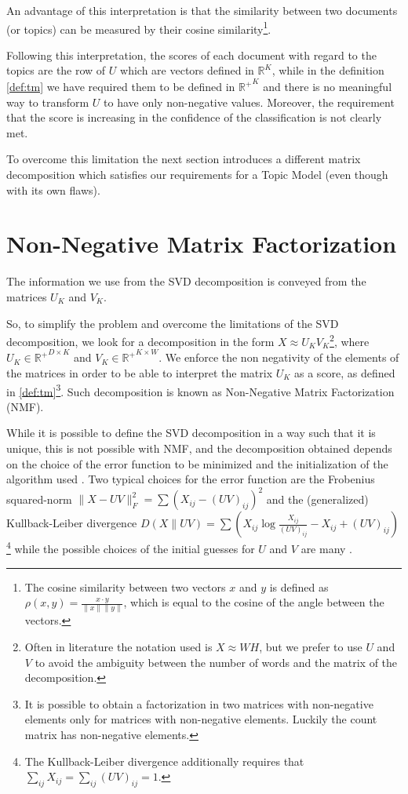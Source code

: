 \documentclass[11pt, a4paper, oneside, openright]{book}
\begin{document}
An advantage of this interpretation is that the similarity between two documents (or topics) can be measured by their cosine similarity\footnote{The cosine similarity between two vectors $x$ and $y$ is defined as $\rho(x,y) = \frac{x \cdot y}{\|x\|\|y\|}$, which is equal to the cosine of the angle between the vectors.}.

Following this interpretation, the scores of each document with regard to the topics are the row of $U$ which are vectors defined in $\mathbb{R}^K$, while in the definition \ref{def:tm} we have required them to be defined in ${\mathbb{R}^+}^K$ and there is no meaningful way to transform $U$ to have only non-negative values. Moreover, the requirement that the score is increasing in the confidence of the classification is not clearly met.

To overcome this limitation the next section introduces a different matrix decomposition which satisfies our requirements for a Topic Model (even though with its own flaws). 

\section{Non-Negative Matrix Factorization}
\label{sec:nmf}
The information we use from the SVD decomposition is conveyed from the matrices $U_K$ and $V_K$.

So, to simplify the problem and overcome the limitations of the SVD decomposition, we look for a decomposition in the form $X \approx U_K V_K$\footnote{Often in literature the notation used is $X \approx WH$, but we prefer to use $U$ and $V$ to avoid the ambiguity between the number of words and the matrix of the decomposition.}, where $U_K \in {\mathbb{R}^+}^{D\times K}$ and $V_K \in {\mathbb{R}^+}^{K \times W}$. We enforce the non negativity of the elements of the matrices in order to be able to interpret the matrix $U_K$ as a score, as defined in \ref{def:tm}\footnote{It is possible to obtain a factorization in two matrices with non-negative elements only for matrices with non-negative elements. Luckily the count matrix has non-negative elements.}.
Such decomposition is known as Non-Negative Matrix Factorization (NMF).

While it is possible to define the SVD decomposition in a way such that it is unique, this is not possible with NMF, and the decomposition obtained depends on the choice of the error function to be minimized and the initialization of the algorithm used \parencite{langville2014, berry2007, lee2000}.
Two typical choices for the error function are the Frobenius squared-norm $\| X - UV \|_F^2 = \sum (X_{ij} - (UV)_{ij})^2$ and the (generalized) Kullback-Leiber divergence $D(X\|UV) = \sum(X_{ij}\log\frac{X_{ij}}{(UV)_{ij}}-X_{ij}+(UV)_{ij})$\footnote{The Kullback-Leiber divergence additionally requires that $\sum_{ij}X_{ij}=\sum_{ij}(UV)_{ij}=1$.} \parencite{lee2000} while the possible choices of the initial guesses for $U$ and $V$ are many \parencite{langville2014}.
\end{document}
